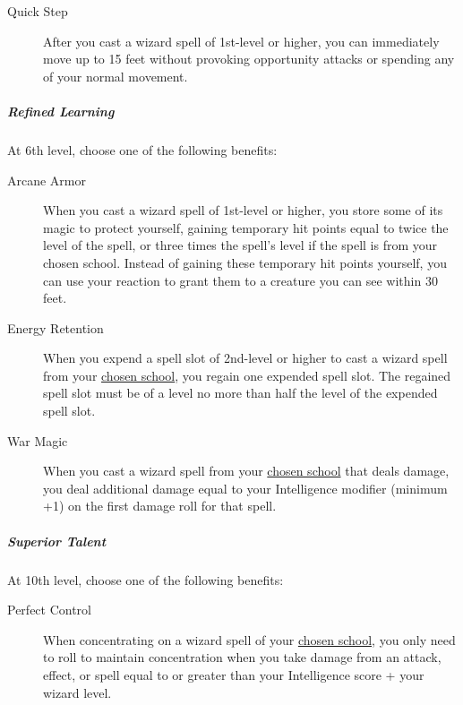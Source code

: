 \begin{description}
\item[Quick Step]
After you cast a wizard spell of 1st-level or higher, you can
immediately move up to 15 feet without provoking opportunity attacks or
spending any of your normal movement.
\end{description}

\subparagraph{Refined
Learning}\label{wizard-subclass-arcanist-refined-learning}

At 6th level, choose one of the following benefits:

\begin{description}
\item[Arcane Armor]
When you cast a wizard spell of 1st-level or higher, you store some of
its magic to protect yourself, gaining temporary hit points equal to
twice the level of the spell, or three times the spell's level if the
spell is from your chosen school. Instead of gaining these temporary hit
points yourself, you can use your reaction to grant them to a creature
you can see within 30 feet.
\end{description}

\begin{description}
\item[Energy Retention]
When you expend a spell slot of 2nd-level or higher to cast a wizard
spell from your
\hyperref[wizard-subclass-arcanist-scholarly-speciality]{chosen school},
you regain one expended spell slot. The regained spell slot must be of a
level no more than half the level of the expended spell slot.
\end{description}

\begin{description}
\item[War Magic]
When you cast a wizard spell from your
\hyperref[wizard-subclass-arcanist-scholarly-speciality]{chosen school}
that deals damage, you deal additional damage equal to your Intelligence
modifier (minimum +1) on the first damage roll for that spell.
\end{description}

\subparagraph{Superior
Talent}\label{wizard-subclass-arcanist-superior-talent}

At 10th level, choose one of the following benefits:

\begin{description}
\item[Perfect Control]
When concentrating on a wizard spell of your
\hyperref[wizard-subclass-arcanist-scholarly-speciality]{chosen school},
you only need to roll to maintain concentration when you take damage
from an attack, effect, or spell equal to or greater than your
Intelligence score + your wizard level.
\end{description}

